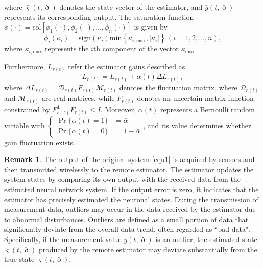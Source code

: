 \documentclass[preprint,review,fleqn,sort&compress,3p]{elsarticle}
\theoremstyle{definition}%
\newtheorem{rem}{Remark}[section]
\begin{document}
	where $\bar{\varsigma}(t,\eth)$ denotes the state vector of the estimator, and $\bar{y}(t,\eth)$ represents its corresponding output. The saturation function $\phi(\cdot) = \text{col}\left[\phi_1(\cdot), \phi_2(\cdot), \dots, \phi_n(\cdot)\right]$ is given by
	\begin{equation}\label{equ4}
		\phi_i(\kappa_i) = \text{sign}\left(\kappa_i\right)\text{min}\left\{\kappa_{i,\text{max}},\lvert \kappa_i \rvert\right\}\,(i=1,2,\dots,n),
	\end{equation}
	where $\kappa_{i,\text{max}}$ represents the $i$th component of the vector $\kappa_{\text{max}}$.
	
	Furthermore, $\bar{L}_{r(t)}$ refer the estimator gains described as
	\begin{equation}
		\bar{L}_{r(t)} = L_{r(t)} + \alpha(t) \Delta L_{r(t)},
	\end{equation}
	where $\Delta L_{r(t)} = \mathcal{D}_{r(t)} F_{r(t)} \mathcal{M}_{r(t)} $ denotes the fluctuation matrix, where $ \mathcal{D}_{r(t)} $ and $ \mathcal{M}_{r(t)} $ are real matrices, while $ F_{r(t)} $ denotes an uncertain matrix function constrained by $ F_{r(t)}^\text{T} F_{r(t)} \leq I $. Moreover, $\alpha(t) $ represents a Bernoulli random variable with $\left\{
	\begin{aligned}
		\Pr \{\alpha(t)= 1\}&= \bar{\alpha}\\ 
		\Pr \{\alpha(t) = 0\}& = 1 - \bar{\alpha}
	\end{aligned}
	\right.$, and its value determines whether gain fluctuation exists.
	\begin{rem}\label{rem2}
	The output of the original system \eqref{equ1} is acquired by sensors and then transmitted wirelessly to the remote estimator. The estimator updates the system states by comparing its own output with the received data from the estimated neural network system. If the output error is zero, it indicates that the estimator has precisely estimated the neuronal states. During the transmission of measurement data, outliers may occur in the data received by the estimator due to abnormal disturbances. Outliers are defined as a small portion of data that significantly deviate from the overall data trend, often regarded as ``bad data". Specifically, if the measurement value $y(t,\eth)$ is an outlier, the estimated state $\bar{\varsigma}(t,\eth)$ produced by the remote estimator may deviate substantially from the true state $\varsigma(t,\eth)$.
	\end{rem}
		
\end{document}
